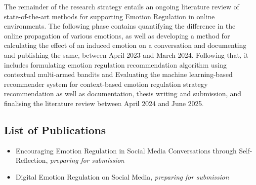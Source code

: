 The remainder of the research strategy entails an ongoing literature review of state-of-the-art methods for supporting Emotion Regulation in online environments. The following phase contains quantifying the difference in the online propagation of various emotions, as well as developing a method for calculating the effect of an induced emotion on a conversation and documenting and publishing the same, between April 2023 and March 2024. Following that, it includes formulating emotion regulation recommendation algorithm using contextual multi-armed bandits and Evaluating the machine learning-based recommender system for context-based emotion regulation strategy recommendation as well as documentation, thesis writing and submission, and finalising the literature review between April 2024 and June 2025.
  
\subsection{List of Publications}
\begin{itemize}
    \item Encouraging Emotion Regulation in Social Media Conversations through Self-Reflection, \textit{preparing for submission}
    \item Digital Emotion Regulation on Social Media, \textit{preparing for submission}
\end{itemize}

